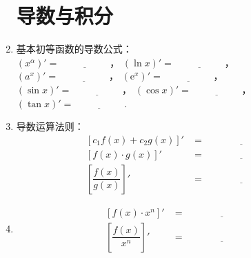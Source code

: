 \documentclass{article}
\newif\ifte
\newcommand{\e}{\mathrm{e}}
\begin{document}
\begin{multicols}{2}
\begin{enumerate}[leftmargin=20pt]
\section{导数与积分}

\item 基本初等函数的导数公式：\\
$ (x^{\alpha})'=\underline{\ \ifte \alpha x^{\alpha-1}
    \else \hspace{2cm} \fi\ } $，
$ (\ln x)'=\underline{\ \ifte \frac{1}{x}\else \hspace{2cm} \fi\ } $，\\
$ (a^x)'=\underline{\ \ifte (\ln a) a^x\else \hspace{2cm} \fi\ } $，
$ (\e^x)'=\underline{\ \ifte \e^x\else \hspace{2cm} \fi\ } $，\\
$ (\sin x)'=\underline{\ \ifte \cos  x\else \hspace{2cm} \fi\ } $，
$ (\cos  x)'=\underline{\ \ifte -\sin x\else \hspace{2cm} \fi\ } $，\\
$ (\tan x)'=\underline{\ \ifte \dfrac{1}{\cos ^2 x}
    \else \hspace{2cm} \fi\ } $.

\item 导数运算法则：
\begin{align*}
\left[c_1f(x)+c_2g(x)\right]'&=\underline{\ \ifte 
    c_1f'(x)+c_2g'(x) \else \hspace{3cm} \fi\ } \\
\left[f(x)\cdot g(x) \right]'&= \underline{\ \ifte 
    f'(x)\cdot g(x)+f(x)\cdot g'(x) \else \hspace{3cm} \fi\ } \\
\left[ \dfrac{f(x)}{g(x)}\right]'&=\underline{\ \ifte 
    \dfrac{f'(x)\cdot g(x)-f(x)\cdot g'(x)}{g^2(x)}
    \else \hspace{3cm} \fi\ }
\end{align*}

\item 
\begin{align*}
    \left[f(x)\cdot x^n \right]'&= \underline{\ 
      \ifte x^n f'(x)+nx^{n-1}f(x) \else \hspace{3cm} \fi\ } \\
    \left[ \dfrac{f(x)}{x^n}\right]' &=\underline{\ 
      \ifte \dfrac{xf'(x)-nf(x)}{x^{n+1}} \else \hspace{3cm} \fi\ }
\end{align*}



\end{enumerate}
\end{multicols}
\end{document}
